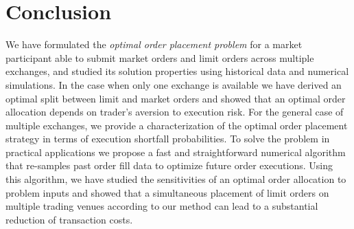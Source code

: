 \documentclass[opre,nonblindrev]{informs3}
\begin{document}
\newpage
\section{Conclusion}\label{sec.conc}

We have formulated the {\it optimal order placement problem} for a market participant able to submit market orders and limit orders across multiple exchanges, and studied its solution properties using historical data and numerical simulations. In the case when only one exchange is available we have derived an optimal split between limit and  market orders and showed that an optimal order allocation depends on trader's aversion to execution risk. For the general case of multiple exchanges, we provide a characterization of the optimal order placement strategy in terms of execution shortfall probabilities. To solve the problem in practical applications we propose a fast and straightforward numerical algorithm that re-samples past order fill data to optimize future order executions. Using this algorithm, we have studied the sensitivities of an optimal order allocation to problem inputs and showed that a simultaneous placement of limit orders on multiple trading venues according to our method can lead to a substantial reduction of transaction costs.



%
\end{document}
